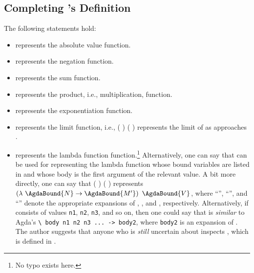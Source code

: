 \documentclass{report}
\begin{document}
\subsection{Completing 's Definition}
The following statements hold:

\begin{itemize}
  \item {} represents the absolute value function.
  \item {} represents the negation function.
  \item {} represents the sum function.
  \item {} represents the product, i.e., multiplication, function.
  \item {} represents the exponentiation function.
  \item {} represents the limit function, i.e.,  \AgdaSymbol( \AgdaSymbol) \AgdaSymbol(    \AgdaSymbol) represents the limit of  as  approaches .
  \item {} represents the lambda function function.\footnote{No typo exists here.}  Alternatively, one can say that   can be used for representing the lambda function whose bound variables are listed in  and whose body is the first argument of the relevant  value.  A bit more directly, one can say that  \AgdaSymbol( \AgdaSymbol) \AgdaSymbol(  \AgdaSymbol) represents \(\left(\lambda\ \AgdaBound{N} \rightarrow \AgdaBound{M'}\right)\ \AgdaBound{V}\), where ``'', ``'', and ``'' denote the appropriate expansions of , , and , respectively.  Alternatively, if  consists of values \texttt{n1}, \texttt{n2}, \texttt{n3}, and so on, then one could say that   is \emph{similar} to Agda's \texttt{\textbackslash\ body n1 n2 n3 ... -> body2}, where \texttt{body2} is an expansion of .  The author suggests that anyone who is \emph{still} uncertain about  inspects , which is defined in .
  {
    \newcommand{\boilerplateBogusTrigCrap}[2]{
      \item \AgdaInductiveConstructor{#1} represents the trigonometric #2 function.
    }

}
\end{itemize}
\end{document}
